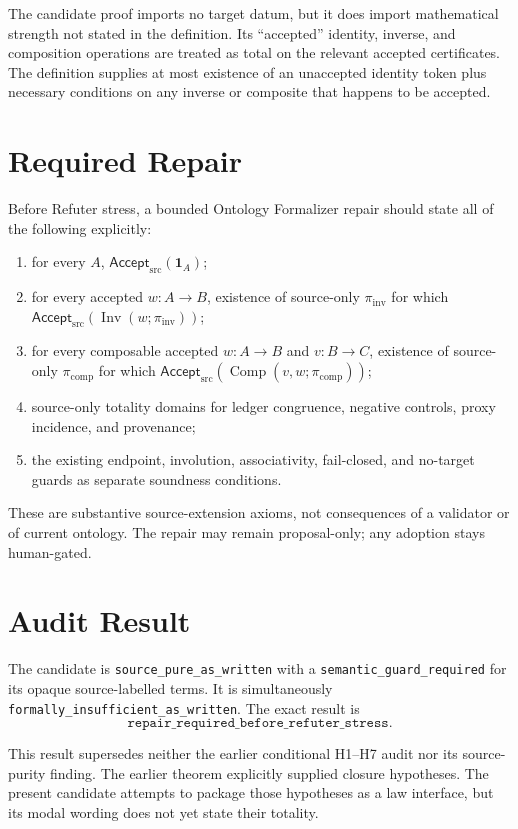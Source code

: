 \documentclass[11pt]{article}
\newcommand{\Accept}{\mathsf{Accept}_{\mathrm{src}}}
\begin{document}
The candidate proof imports no target datum, but it does import mathematical
strength not stated in the definition. Its ``accepted'' identity, inverse, and
composition operations are treated as total on the relevant accepted
certificates. The definition supplies at most existence of an unaccepted
identity token plus necessary conditions on any inverse or composite that
happens to be accepted.

\section{Required Repair}

Before Refuter stress, a bounded Ontology Formalizer repair should state all
of the following explicitly:
\begin{enumerate}[leftmargin=*]
  \item for every \(A\), \(\Accept(\mathbf 1_A)\);
  \item for every accepted \(w:A\to B\), existence of source-only
  \(\pi_{\mathrm{inv}}\) for which
  \(\Accept(\operatorname{Inv}(w;\pi_{\mathrm{inv}}))\);
  \item for every composable accepted \(w:A\to B\) and \(v:B\to C\),
  existence of source-only \(\pi_{\mathrm{comp}}\) for which
  \(\Accept(\operatorname{Comp}(v,w;\pi_{\mathrm{comp}}))\);
  \item source-only totality domains for ledger congruence, negative controls,
  proxy incidence, and provenance;
  \item the existing endpoint, involution, associativity, fail-closed, and
  no-target guards as separate soundness conditions.
\end{enumerate}

These are substantive source-extension axioms, not consequences of a
validator or of current ontology. The repair may remain proposal-only; any
adoption stays human-gated.

\section{Audit Result}

The candidate is \texttt{source\_pure\_as\_written} with a
\texttt{semantic\_guard\_required} for its opaque source-labelled terms.
It is simultaneously
\texttt{formally\_insufficient\_as\_written}. The exact result is
\[
 \boxed{\texttt{repair\_required\_before\_refuter\_stress}}.
\]

This result supersedes neither the earlier conditional H1--H7 audit nor its
source-purity finding. The earlier theorem explicitly supplied closure
hypotheses. The present candidate attempts to package those hypotheses as a
law interface, but its modal wording does not yet state their totality.
\end{document}
